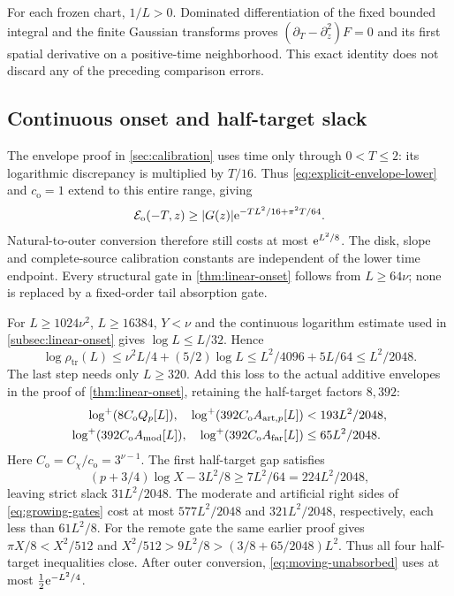 For each frozen chart, \(1/L>0\). Dominated differentiation of the fixed
bounded integral and the finite Gaussian transforms proves
\((\partial_T-\partial_z^2)F=0\) and its first spatial derivative on a
positive-time neighborhood. This exact identity does not discard any of
the preceding comparison errors.

\subsection{Continuous onset and half-target slack}
\label{subsec:moving-onset-proof}
The envelope proof in \cref{sec:calibration} uses time only through
\(0<T\le2\): its logarithmic discrepancy is multiplied by \(T/16\).
Thus \eqref{eq:explicit-envelope-lower} and
\(c_{\mathrm o}=1\) extend to this entire range, giving
\[
 \mathcal E_{\mathrm o}(-T,z)\ge|G(z)|
                 \mathrm e^{-TL^2/16+\pi^2T/64}.
\]
Natural-to-outer conversion therefore still costs at most
\(\mathrm e^{L^2/8}\). The disk, slope and complete-source calibration constants
are independent of the lower time endpoint. Every structural gate in
\cref{thm:linear-onset} follows from \(L\ge64\nu\); none is replaced by
a fixed-order tail absorption gate.

For \(L\ge1024\nu^2\), \(L\ge16384\), \(Y<\nu\) and the continuous
logarithm estimate used in \cref{subsec:linear-onset} gives
\(\log L\le L/32\). Hence
\begin{equation}
 \log\rho_{\mathrm{tr}}(L)
 \le\nu^2L/4+(5/2)\log L
 \le L^2/4096+5L/64\le L^2/2048.
 \label{eq:moving-rho-slack}
\end{equation}
The last step needs only \(L\ge320\).
Add this loss to the actual additive envelopes in the proof of
\cref{thm:linear-onset}, retaining the half-target factors \(8,392\):
\begin{align}
 \log^{+}(8C_{\mathrm o}Q_p[L]),\quad
 \log^{+}(392C_{\mathrm o}A_{\mathrm{art},p}[L])
                      &<193L^2/2048,\nonumber\\
 \log^{+}(392C_{\mathrm o}A_{\mathrm{mod}}[L]),\quad
 \log^{+}(392C_{\mathrm o}A_{\mathrm{far}}[L])
                      &\le65L^2/2048.
 \label{eq:moving-prefactor-slack}
\end{align}
Here \(C_{\mathrm o}=C_\chi/c_{\mathrm o}=3^{\nu-1}\).
The first half-target gap satisfies
\[
 (p+3/4)\log X-3L^2/8\ge7L^2/64=224L^2/2048,
\]
leaving strict slack \(31L^2/2048\). The moderate and artificial
right sides of \eqref{eq:growing-gates} cost at most
\(577L^2/2048\) and \(321L^2/2048\), respectively, each less than
\(61L^2/8\). For the remote gate the same earlier proof gives
\(\pi X/8<X^2/512\) and
\(X^2/512>9L^2/8>(3/8+65/2048)L^2\).
Thus all four half-target inequalities close. After outer conversion,
\eqref{eq:moving-unabsorbed} uses at most \(\tfrac12\mathrm e^{-L^2/4}\).

